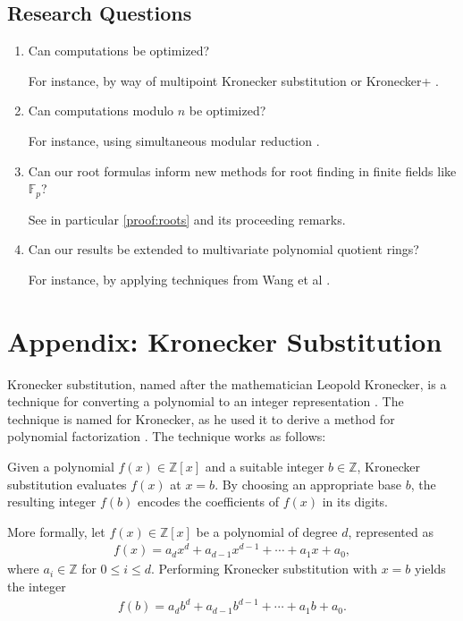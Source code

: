 \documentclass[12pt]{article}
\theoremstyle{plain}
\theoremstyle{definition}
\begin{document}
\subsection{Research Questions}
\begin{enumerate}
    \item Can computations be optimized?
    
    For instance, by way of multipoint Kronecker substitution or Kronecker+ \cite{harvey2009kronecker, bos2020postquantum}.
    
    \item Can computations modulo $n$ be optimized?
    
    For instance, using simultaneous modular reduction \cite{dumas2011simulataneous}.
    
    \item Can our root formulas inform new methods for root finding in finite fields like $\mathbb{F}_p$?
    
    See in particular \cref{proof:roots} and its proceeding remarks.

     \item Can our results be extended to multivariate polynomial quotient rings?

     For instance, by applying techniques from Wang et al \cite{wang2024multivariatekronecker}.
\end{enumerate}

\section{Appendix: Kronecker Substitution} \label{section:kronecker}
Kronecker substitution, named after the mathematician Leopold Kronecker, is a technique for converting a polynomial to an integer representation \cite{gathen2013modern}. The technique is named for Kronecker, as he used it to derive a method for polynomial factorization \cite{kronecker1882}. The technique works as follows:

Given a polynomial $f(x) \in \mathbb{Z}[x]$ and a suitable integer $b \in \mathbb{Z}$, Kronecker substitution evaluates $f(x)$ at $x = b$. By choosing an appropriate base $b$, the resulting integer $f(b)$ encodes the coefficients of $f(x)$ in its digits.

More formally, let $f(x) \in \mathbb{Z}[x]$ be a polynomial of degree $d$, represented as
\begin{align*}
f(x) = a_d x^d + a_{d-1} x^{d-1} + \cdots + a_1 x + a_0,
\end{align*}
where $a_i \in \mathbb{Z}$ for $0 \leq i \leq d$. Performing Kronecker substitution with $x = b$ yields the integer
\begin{align*}
f(b) = a_d b^d + a_{d-1} b^{d-1} + \cdots + a_1 b + a_0.
\end{align*}
\end{document}
